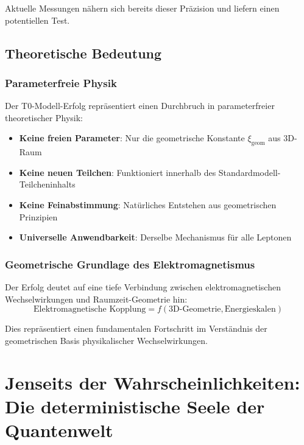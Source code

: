 \documentclass[12pt,a4paper]{report}
\newcommand{\xigeom}{\xi_{\text{geom}}}   %
\begin{document}
	Aktuelle Messungen nähern sich bereits dieser Präzision und liefern einen potentiellen Test.
	
	\section{Theoretische Bedeutung}
	\label{sec:theoretical_significance}
	
	\subsection{Parameterfreie Physik}
	\label{subsec:parameter_free_physics}
	
	Der T0-Modell-Erfolg repräsentiert einen Durchbruch in parameterfreier theoretischer Physik:
	\begin{itemize}
		\item \textbf{Keine freien Parameter}: Nur die geometrische Konstante $\xigeom$ aus 3D-Raum
		\item \textbf{Keine neuen Teilchen}: Funktioniert innerhalb des Standardmodell-Teilcheninhalts
		\item \textbf{Keine Feinabstimmung}: Natürliches Entstehen aus geometrischen Prinzipien
		\item \textbf{Universelle Anwendbarkeit}: Derselbe Mechanismus für alle Leptonen
	\end{itemize}
	
	\subsection{Geometrische Grundlage des Elektromagnetismus}
	\label{subsec:geometric_electromagnetism}
	
	Der Erfolg deutet auf eine tiefe Verbindung zwischen elektromagnetischen Wechselwirkungen und Raumzeit-Geometrie hin:
	\begin{equation}
		\text{Elektromagnetische Kopplung} = f(\text{3D-Geometrie}, \text{Energieskalen})
		\label{eq:electromagnetic_geometry}
	\end{equation}
	
	Dies repräsentiert einen fundamentalen Fortschritt im Verständnis der geometrischen Basis physikalischer Wechselwirkungen.
	

	\chapter{Jenseits der Wahrscheinlichkeiten: Die deterministische Seele der Quantenwelt}
	\label{chap:deterministic_qm}
	
\end{document}
